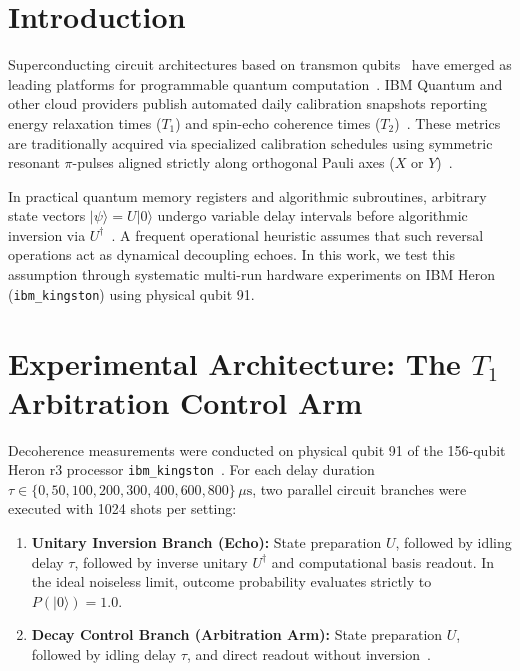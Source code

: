 \documentclass[11pt,a4paper]{article}
\begin{document}
\section{Introduction}
Superconducting circuit architectures based on transmon qubits~\cite{koch2007transmon} have emerged as leading platforms for programmable quantum computation~\cite{arute2019supremacy,blais_cqed}. IBM Quantum and other cloud providers publish automated daily calibration snapshots reporting energy relaxation times ($T_1$) and spin-echo coherence times ($T_2$)~\cite{krantz_guide}. These metrics are traditionally acquired via specialized calibration schedules using symmetric resonant $\pi$-pulses aligned strictly along orthogonal Pauli axes ($X$ or $Y$)~\cite{hahn1950,meiboom1958}.

In practical quantum memory registers and algorithmic subroutines, arbitrary state vectors $|\psi\rangle = U|0\rangle$ undergo variable delay intervals before algorithmic inversion via $U^{\dagger}$~\cite{nielsen_chuang,viola1998dd}. A frequent operational heuristic assumes that such reversal operations act as dynamical decoupling echoes. In this work, we test this assumption through systematic multi-run hardware experiments on IBM Heron (\texttt{ibm\_kingston}) using physical qubit 91.

\section{Experimental Architecture: The $T_1$ Arbitration Control Arm}
Decoherence measurements were conducted on physical qubit 91 of the 156-qubit Heron r3 processor \texttt{ibm\_kingston}~\cite{heron2024}. For each delay duration $\tau \in \{0, 50, 100, 200, 300, 400, 600, 800\}\,\mu\text{s}$, two parallel circuit branches were executed with 1024 shots per setting:

\begin{enumerate}
  \item \textbf{Unitary Inversion Branch (Echo):} State preparation $U$, followed by idling delay $\tau$, followed by inverse unitary $U^{\dagger}$ and computational basis readout. In the ideal noiseless limit, outcome probability evaluates strictly to $P(|0\rangle) = 1.0$.
  \item \textbf{Decay Control Branch (Arbitration Arm):} State preparation $U$, followed by idling delay $\tau$, and direct readout without inversion~\cite{bylander2011noise}.
\end{enumerate}
\end{document}
